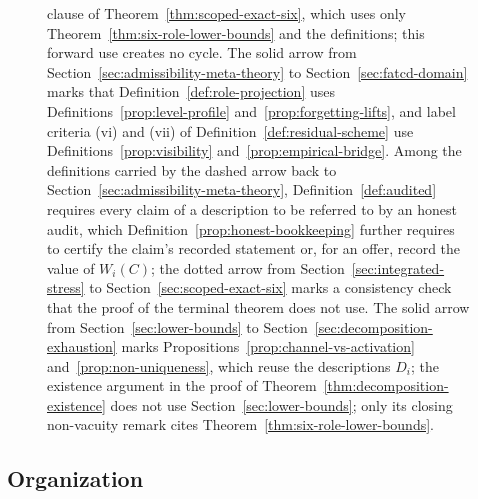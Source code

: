 \documentclass[11pt]{article}
\theoremstyle{definition}
\begin{document}
\begin{figure}[t]
{clause of Theorem~\ref{thm:scoped-exact-six}, which uses only
Theorem~\ref{thm:six-role-lower-bounds} and the definitions; this forward use
creates no cycle. The
solid arrow from Section~\ref{sec:admissibility-meta-theory} to
Section~\ref{sec:fatcd-domain} marks that Definition~\ref{def:role-projection}
uses Definitions~\ref{prop:level-profile} and~\ref{prop:forgetting-lifts}, and
label criteria (vi) and (vii) of Definition~\ref{def:residual-scheme} use
Definitions~\ref{prop:visibility} and~\ref{prop:empirical-bridge}. Among the
definitions carried by the dashed arrow back to
Section~\ref{sec:admissibility-meta-theory}, Definition~\ref{def:audited}
requires every claim of a description to be referred to by an honest audit,
which Definition~\ref{prop:honest-bookkeeping} further requires to certify the claim's recorded statement or, for an offer, record the value of \(W_i(C)\); the dotted arrow from Section~\ref{sec:integrated-stress} to
Section~\ref{sec:scoped-exact-six} marks a consistency check that the proof of
the terminal theorem does not use. The solid arrow from Section~\ref{sec:lower-bounds} to
Section~\ref{sec:decomposition-exhaustion} marks Propositions~\ref{prop:channel-vs-activation}
and~\ref{prop:non-uniqueness}, which reuse the descriptions \(D_i\); the existence argument in the proof of
Theorem~\ref{thm:decomposition-existence} does not use Section~\ref{sec:lower-bounds};
only its closing non-vacuity remark cites Theorem~\ref{thm:six-role-lower-bounds}.}\label{fig:dependencies}
\end{figure}

\subsection{Organization}\label{subsec:organization}
\end{document}
